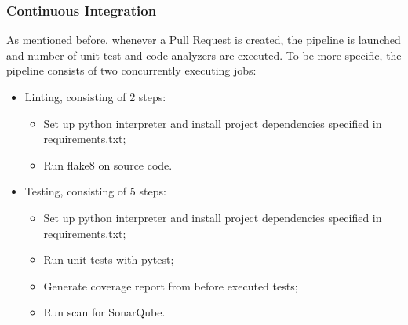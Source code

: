 \documentclass[12pt, fleqn, a4paper]{article}
\begin{document}
\subsubsection{Continuous Integration}
As mentioned before, whenever a Pull Request is created, the pipeline is launched and number of unit test and code analyzers are executed. To be more specific, the pipeline consists of two concurrently executing jobs:
\begin{itemize}
	\item Linting, consisting of 2 steps:
		\begin{itemize}
			\item Set up python interpreter and install project dependencies specified in requirements.txt;
			\item Run flake8 on source code.
		\end{itemize}
	\item Testing, consisting of 5 steps:
		\begin{itemize}
			\item Set up python interpreter and install project dependencies specified in requirements.txt;
			\item Run unit tests with pytest;
			\item Generate coverage report from before executed tests;
			\item Run scan for SonarQube.
		\end{itemize}
\end{itemize}
\end{document}
